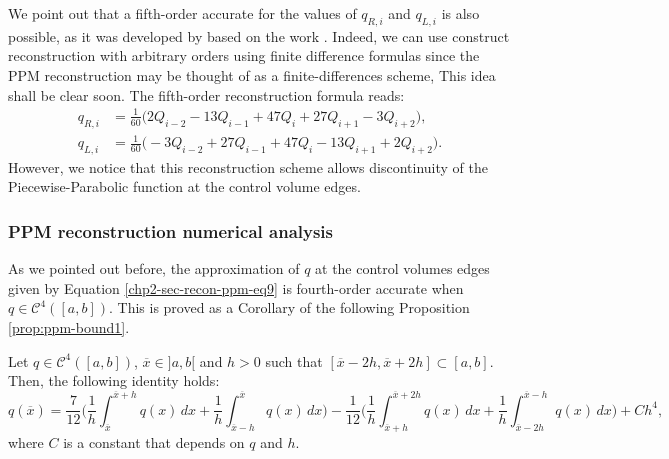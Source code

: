 We point out that a fifth-order accurate for the values of $q_{R,i}$ and $q_{L,i}$
is also possible, as it was developed by \citet{putman:2007} 
based on the work \citet{suresh:1997}. 
Indeed, we can use construct reconstruction with arbitrary orders using finite difference
formulas since the PPM reconstruction may be thought of as a finite-differences scheme,
This idea shall be clear soon.
The fifth-order reconstruction formula reads:
\begin{align}
	\label{chp2-sec-recon-ppm-eq12}
	q_{R,i} &= \frac{1}{60} \bigg( 2Q_{i-2} - 13Q_{i-1} + 47Q_{i} + 27Q_{i+1} - 3Q_{i+2}\bigg), \\
	\label{chp2-sec-recon-ppm-eq13}
	q_{L,i} &= \frac{1}{60} \bigg(-3Q_{i-2} + 27Q_{i-1} + 47Q_{i} - 13Q_{i+1} + 2Q_{i+2}\bigg).
\end{align}
However, we notice that this reconstruction scheme allows discontinuity of the 
Piecewise-Parabolic function at the control volume edges.

\subsubsection{PPM reconstruction numerical analysis}
\label{chp2-sec-numerical-analysis}
As we pointed out before, the approximation of $q$ at the control volumes edges
given by Equation \eqref{chp2-sec-recon-ppm-eq9} is fourth-order accurate when $q \in \mathcal{C}^4([a,b])$. 
This is proved as a Corollary of the following Proposition \ref{prop:ppm-bound1}.
\begin{prop}
	\label{prop:ppm-bound1}
	Let $q \in \mathcal{C}^{4}([a,b])$, $\overline{x} \in ]a,b[ $ and $h>0$ such that 
	$[\overline{x}-2h,\overline{x}+2h] \subset [a,b]$.
	Then, the following identity holds:
	\begin{equation}
		\label{prop:ppm-bound1-eq1}
		q(\overline{x} ) = \frac{7}{12}\bigg( \frac{1}{h} \int_{\overline{x} }^{\overline{x}+h} q(x) \,dx 
		       + \frac{1}{h} \int_{\overline{x} -h}^{\overline{x} } q(x) \,dx  \bigg)
		       - \frac{1}{12}\bigg( \frac{1}{h} \int_{\overline{x} +h}^{\overline{x}+2h} q(x) \,dx 
		       + \frac{1}{h} \int_{\overline{x} -2h}^{\overline{x} -h} q(x) \,dx  \bigg) + Ch^4,
	\end{equation}
	where $C$ is a constant that depends on $q$ and $h$.
\end{prop}

